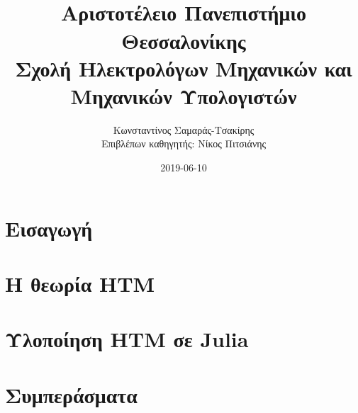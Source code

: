 \documentclass[a4paper,11pt,twoside]{report}
\title{
\titlestring \\
{\large Αριστοτέλειο Πανεπιστήμιο Θεσσαλονίκης}\\
{\large Σχολή Ηλεκτρολόγων Μηχανικών και Μηχανικών Υπολογιστών}
}
\author{Κωνσταντίνος Σαμαράς-Τσακίρης\\ \bigskip
Επιβλέπων καθηγητής: Νίκος Πιτσιάνης}
\date{2019-06-10}
\begin{document}
\maketitle


\tableofcontents{}

\chapter{Εισαγωγή}


\chapter{Η θεωρία HTM}


\chapter{Υλοποίηση HTM σε Julia} \label{impl}




\chapter{Συμπεράσματα}


\printbibliography

%
\end{document}
